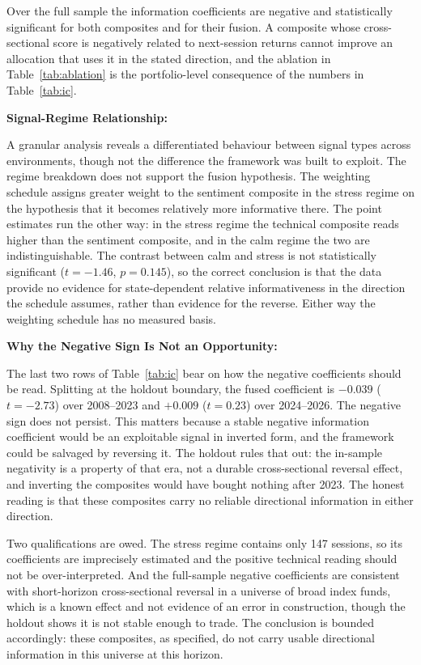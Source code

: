 \documentclass{singlecol-new}
\theoremstyle{TH}{
\newtheorem{lemma}{Lemma}
\newtheorem{theorem}[lemma]{Theorem}
\newtheorem{corrolary}[lemma]{Corrolary}
\newtheorem{conjecture}[lemma]{Conjecture}
\newtheorem{proposition}[lemma]{Proposition}
\newtheorem{claim}[lemma]{Claim}
\newtheorem{stheorem}[lemma]{Wrong Theorem}
\newtheorem{algorithm}{Algorithm}
}
\theoremstyle{THrm}{
\newtheorem{definition}{Definition}[section]
\newtheorem{question}{Question}[section]
\newtheorem{remark}{Remark}
\newtheorem{scheme}{Scheme}
}
\theoremstyle{THhit}{
\newtheorem{case}{Case}[section]
}
\begin{document}
Over the full sample the information coefficients are negative and statistically
significant for both composites and for their fusion. A composite whose cross-sectional
score is negatively related to next-session returns cannot improve an allocation that
uses it in the stated direction, and the ablation in Table~\ref{tab:ablation} is the
portfolio-level consequence of the numbers in Table~\ref{tab:ic}.

\textbf{Signal-Regime Relationship:}

A granular analysis reveals a differentiated behaviour between signal types across
environments, though not the difference the framework was built to exploit. The regime
breakdown does not support the fusion hypothesis. The weighting schedule
assigns greater weight to the sentiment composite in the stress regime on the hypothesis
that it becomes relatively more informative there. The point estimates run the other way:
in the stress regime the technical composite reads higher than the sentiment composite,
and in the calm regime the two are indistinguishable. The contrast between calm and
stress is not statistically significant ($t = -1.46$, $p = 0.145$), so the correct
conclusion is that the data provide no evidence for state-dependent relative
informativeness in the direction the schedule assumes, rather than evidence for the
reverse. Either way the weighting schedule has no measured basis.

\textbf{Why the Negative Sign Is Not an Opportunity:}

The last two rows of Table~\ref{tab:ic} bear on how the negative coefficients should be
read. Splitting at the holdout boundary, the fused coefficient is $-0.039$ ($t = -2.73$)
over 2008--2023 and $+0.009$ ($t = 0.23$) over 2024--2026. The negative sign does not
persist. This matters because a stable negative information coefficient would be an
exploitable signal in inverted form, and the framework could be salvaged by reversing it.
The holdout rules that out: the in-sample negativity is a property of that era, not a
durable cross-sectional reversal effect, and inverting the composites would have bought
nothing after 2023. The honest reading is that these composites carry no reliable
directional information in either direction.

Two qualifications are owed. The stress regime contains only 147 sessions, so its
coefficients are imprecisely estimated and the positive technical reading should not be
over-interpreted. And the full-sample negative coefficients are consistent with
short-horizon cross-sectional reversal in a universe of broad index funds, which is a
known effect and not evidence of an error in construction, though the holdout shows it is
not stable enough to trade. The conclusion is bounded accordingly: these composites, as
specified, do not carry usable directional information in this universe at this horizon.
\end{document}

